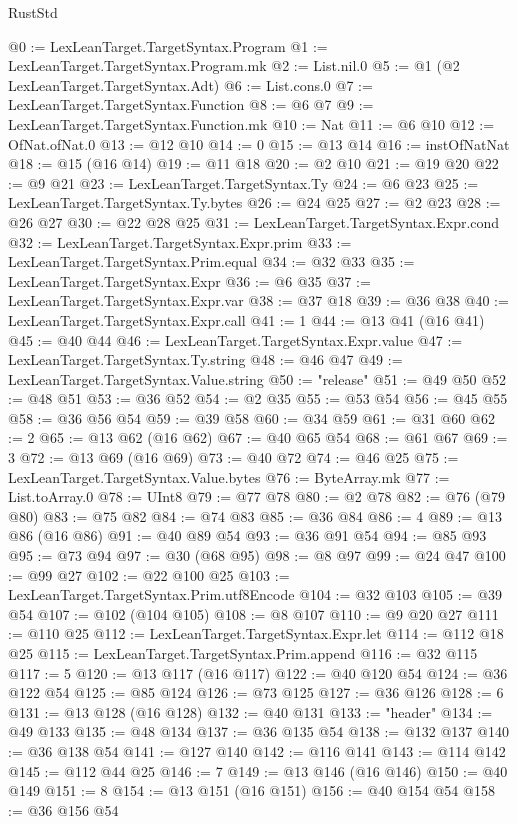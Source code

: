 \begin{lexlean}{RustStd}
\begin{coremodule}
@0 := LexLeanTarget.TargetSyntax.Program
@1 := LexLeanTarget.TargetSyntax.Program.mk
@2 := List.nil.{0}
@5 := @1 (@2 LexLeanTarget.TargetSyntax.Adt)
@6 := List.cons.{0}
@7 := LexLeanTarget.TargetSyntax.Function
@8 := @6 @7
@9 := LexLeanTarget.TargetSyntax.Function.mk
@10 := Nat
@11 := @6 @10
@12 := OfNat.ofNat.{0}
@13 := @12 @10
@14 := 0
@15 := @13 @14
@16 := instOfNatNat
@18 := @15 (@16 @14)
@19 := @11 @18
@20 := @2 @10
@21 := @19 @20
@22 := @9 @21
@23 := LexLeanTarget.TargetSyntax.Ty
@24 := @6 @23
@25 := LexLeanTarget.TargetSyntax.Ty.bytes
@26 := @24 @25
@27 := @2 @23
@28 := @26 @27
@30 := @22 @28 @25
@31 := LexLeanTarget.TargetSyntax.Expr.cond
@32 := LexLeanTarget.TargetSyntax.Expr.prim
@33 := LexLeanTarget.TargetSyntax.Prim.equal
@34 := @32 @33
@35 := LexLeanTarget.TargetSyntax.Expr
@36 := @6 @35
@37 := LexLeanTarget.TargetSyntax.Expr.var
@38 := @37 @18
@39 := @36 @38
@40 := LexLeanTarget.TargetSyntax.Expr.call
@41 := 1
@44 := @13 @41 (@16 @41)
@45 := @40 @44
@46 := LexLeanTarget.TargetSyntax.Expr.value
@47 := LexLeanTarget.TargetSyntax.Ty.string
@48 := @46 @47
@49 := LexLeanTarget.TargetSyntax.Value.string
@50 := "release"
@51 := @49 @50
@52 := @48 @51
@53 := @36 @52
@54 := @2 @35
@55 := @53 @54
@56 := @45 @55
@58 := @36 @56 @54
@59 := @39 @58
@60 := @34 @59
@61 := @31 @60
@62 := 2
@65 := @13 @62 (@16 @62)
@67 := @40 @65 @54
@68 := @61 @67
@69 := 3
@72 := @13 @69 (@16 @69)
@73 := @40 @72
@74 := @46 @25
@75 := LexLeanTarget.TargetSyntax.Value.bytes
@76 := ByteArray.mk
@77 := List.toArray.{0}
@78 := UInt8
@79 := @77 @78
@80 := @2 @78
@82 := @76 (@79 @80)
@83 := @75 @82
@84 := @74 @83
@85 := @36 @84
@86 := 4
@89 := @13 @86 (@16 @86)
@91 := @40 @89 @54
@93 := @36 @91 @54
@94 := @85 @93
@95 := @73 @94
@97 := @30 (@68 @95)
@98 := @8 @97
@99 := @24 @47
@100 := @99 @27
@102 := @22 @100 @25
@103 := LexLeanTarget.TargetSyntax.Prim.utf8Encode
@104 := @32 @103
@105 := @39 @54
@107 := @102 (@104 @105)
@108 := @8 @107
@110 := @9 @20 @27
@111 := @110 @25
@112 := LexLeanTarget.TargetSyntax.Expr.let
@114 := @112 @18 @25
@115 := LexLeanTarget.TargetSyntax.Prim.append
@116 := @32 @115
@117 := 5
@120 := @13 @117 (@16 @117)
@122 := @40 @120 @54
@124 := @36 @122 @54
@125 := @85 @124
@126 := @73 @125
@127 := @36 @126
@128 := 6
@131 := @13 @128 (@16 @128)
@132 := @40 @131
@133 := "header"
@134 := @49 @133
@135 := @48 @134
@137 := @36 @135 @54
@138 := @132 @137
@140 := @36 @138 @54
@141 := @127 @140
@142 := @116 @141
@143 := @114 @142
@145 := @112 @44 @25
@146 := 7
@149 := @13 @146 (@16 @146)
@150 := @40 @149
@151 := 8
@154 := @13 @151 (@16 @151)
@156 := @40 @154 @54
@158 := @36 @156 @54

\end{coremodule}
\end{lexlean}
